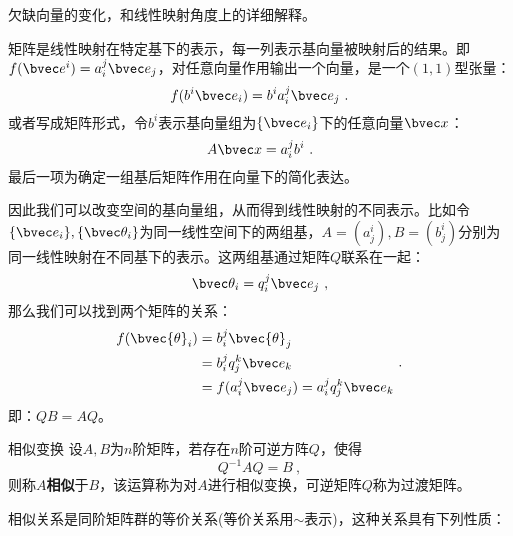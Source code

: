 
\begin{issues}
\issueDraft 欠缺向量的变化，和线性映射角度上的详细解释。
\end{issues}



矩阵是线性映射在特定基下的表示，每一列表示基向量被映射后的结果。即$f(\bvec e^i)=a^j_i\bvec e_j$，对任意向量作用输出一个向量，是一个$(1,1)$型张量：
\begin{equation}
f(b^i\bvec e_i)=b^ia^j_i\bvec e_j~.
\end{equation}
或者写成矩阵形式，令$b^i$表示基向量组为$\{\bvec e_i\}$下的任意向量$\bvec x$：
\begin{equation}
A\bvec x= a^j_i b^i~.
\end{equation}
最后一项为确定一组基后矩阵作用在向量下的简化表达。

因此我们可以改变空间的基向量组，从而得到线性映射的不同表示。比如令$\{\bvec e_i\},\{\bvec \theta_i\}$为同一线性空间下的两组基，$A=(a^i_j),B=(b^i_j)$分别为同一线性映射在不同基下的表示。这两组基通过矩阵$Q$联系在一起：
\begin{equation}
\bvec \theta_i=q^j_i\bvec e_j~,
\end{equation}
那么我们可以找到两个矩阵的关系：
\begin{equation}
\begin{aligned}
f(\bvec {\theta}_i)&=b^j_i\bvec {\theta}_j\\
&=b^j_i  q^k_j\bvec e_k\\
&=f( a^j_i\bvec e_j)=a^j_iq^k_j\bvec e_k
\end{aligned}~.
\end{equation}
即：$QB=AQ$。
\begin{definition}{相似变换}\label{def_MatSim_1}
设$A,B$为$n$阶矩阵，若存在$n$阶可逆方阵$Q$，使得
\begin{equation}
Q^{-1}AQ=B~,
\end{equation}
则称$A$\textbf{相似}于$B$，该运算称为对$A$进行相似变换，可逆矩阵$Q$称为过渡矩阵。
\end{definition}
相似关系是同阶矩阵群的等价关系(等价关系用$\sim $表示)，这种关系具有下列性质：

